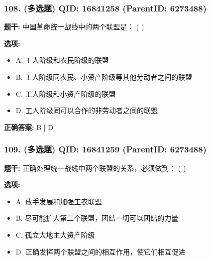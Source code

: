 \documentclass[12pt,UTF8]{ctexart}
\begin{document}
\vspace{0.3em}\hrulefill\vspace{0.7em}

\subsubsection*{108. (多选题) \small QID: 16841258 (ParentID: 6273488)}

\textbf{题干:}
中国革命统一战线中的两个联盟是： ( )



\textbf{选项:}
\begin{itemize}[leftmargin=*]

  \item A. 工人阶级和农民阶级的联盟

  \item B. 工人阶级同农民、小资产阶级等其他劳动者之间的联盟

  \item C. 工人阶级和小资产阶级的联盟

  \item D. 工人阶级同可以合作的非劳动者之间的联盟

\end{itemize}

\textbf{正确答案:}
B | D

\vspace{0.3em}\hrulefill\vspace{0.7em}

\subsubsection*{109. (多选题) \small QID: 16841259 (ParentID: 6273488)}

\textbf{题干:}
正确处理统一战线中两个联盟的关系，必须做到： ( )



\textbf{选项:}
\begin{itemize}[leftmargin=*]

  \item A. 放手发展和加强工农联盟

  \item B. 尽可能扩大第二个联盟，团结一切可以团结的力量

  \item C. 孤立大地主大资产阶级

  \item D. 正确发挥两个联盟之间的相互作用，使它们相互促进

\end{itemize}
\end{document}
